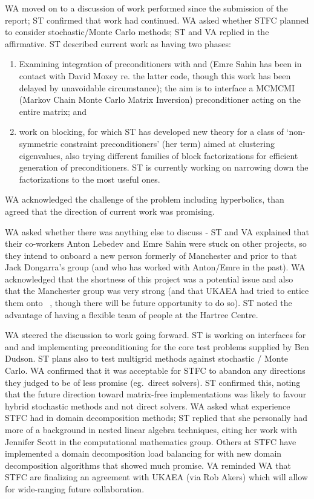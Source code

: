 WA moved on to a discussion of work performed since the submission of the 
report; ST confirmed that work had continued.  WA asked whether STFC planned to 
consider stochastic/Monte Carlo methods; ST and VA replied in the 
affirmative.  ST described current work as having two phases: 
\begin{enumerate}
\item Examining integration of preconditioners with  and  (Emre Sahin has been 
in contact with David Moxey re. the latter code, though this work has been 
delayed by unavoidable circumstance); the aim is to interface a MCMCMI (Markov 
Chain Monte Carlo Matrix Inversion) preconditioner acting on the entire matrix; 
and
\item  work on blocking, for which ST has developed new theory for a class of 
`non-symmetric constraint preconditioners' (her term) aimed at clustering 
eigenvalues, also trying different families of block factorizations for 
efficient generation of preconditioners.  ST is currently working on narrowing 
down the factorizations to the most useful ones. 
\end{enumerate}
WA acknowledged the challenge 
of the problem including hyperbolics, than agreed that the direction of current 
work was promising.

WA asked whether there was anything else to discuss - ST and VA explained that 
their co-workers Anton Lebedev and Emre Sahin were stuck on other projects, so they intend to 
onboard a new person formerly of Manchester and prior to that Jack Dongarra's 
group (and who has worked with Anton/Emre in the past).  WA acknowledged that 
the shortness of this project was a potential issue and also that the 
Manchester group was very strong (and that UKAEA had tried to entice them onto 
\nep\ , though there will be future opportunity to do so).  ST noted the 
advantage of having a flexible team of people at the Hartree Centre.

WA steered the discussion to work going forward.  ST is working on interfaces 
for  and  and implementing preconditioning for the core 
test problems supplied by Ben Dudson.  ST plans also to test multigrid methods 
against stochastic / Monte Carlo.  WA confirmed that it was acceptable for STFC 
to abandon any directions they judged to be of less promise (eg.\ direct 
solvers).  ST confirmed this, noting that the future direction toward 
matrix-free implementations was likely to favour hybrid stochastic methods and 
not direct solvers.  WA asked what experience STFC had in domain decomposition 
methods; ST replied that she personally had more of a background in nested 
linear algebra techniques, citing her work with Jennifer Scott in the 
computational mathematics group.  Others at STFC have implemented a domain 
decomposition load balancing for  with new domain decomposition 
algorithms that showed much promise.  VA reminded WA that STFC are finalizing an 
agreement with UKAEA (via Rob Akers) which will allow for wide-ranging 
future collaboration.

